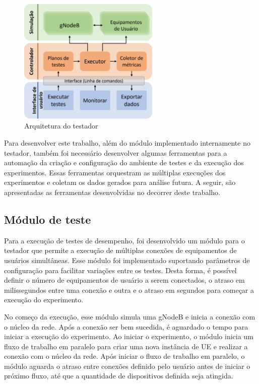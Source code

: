\begin{figure}[!ht]
    \centering
    \includegraphics[width=0.6\textwidth]{TG2/Chapters/Soluction/Figures/Arquitetura-Componentes.png}
    \caption{Arquitetura do testador}
    \label{fig:tester_arch}
\end{figure}


Para desenvolver este trabalho, além do módulo implementado internamente no testador, também foi necessário desenvolver algumas ferramentas para a automação da criação e configuração do ambiente de testes e da execução dos experimentos. Essas ferramentas orquestram as múltiplas execuções dos experimentos e coletam os dados gerados para análise futura. A seguir, são apresentadas as ferramentas desenvolvidas no decorrer deste trabalho.

\subsection{Módulo de teste}

Para a execução de testes de desempenho, foi desenvolvido um módulo para o testador que permite a execução de múltiplas conexões de equipamentos de usuários simultâneas.
Esse módulo foi implementado suportando parâmetros de configuração para facilitar variações entre os testes. 
Desta forma, é possível definir o número de equipamentos de usuário a serem conectados, o atraso em milissegundos entre uma conexão e outra e o atraso em segundos para começar a execução do experimento.

No começo da execução, esse módulo simula uma gNodeB e inicia a conexão com o núcleo da rede. Após a conexão ser bem sucedida, é aguardado o tempo para iniciar a execução do experimento.
Ao iniciar o experimento, o módulo inicia um fluxo de trabalho em paralelo para criar uma nova instância de UE e realizar a conexão com o núcleo da rede.
Após iniciar o fluxo de trabalho em paralelo, o módulo aguarda o atraso entre conexões definido pelo usuário antes de iniciar o próximo fluxo, até que a quantidade de dispositivos definida seja atingida.

